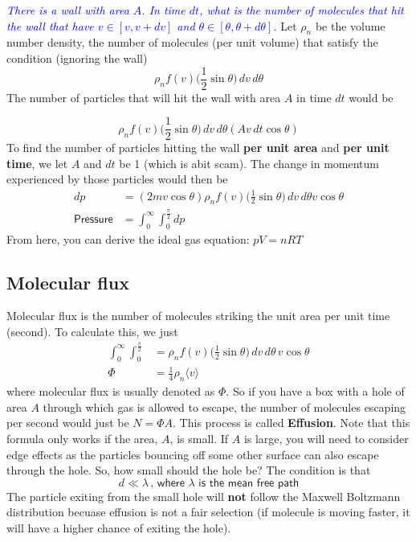 \textcolor{blue}{\textit{There is a wall with area $A$. In time $dt$, what is the number of molecules that hit the wall that have $v \in [v,v+dv]$ and $\theta \in [\theta,\theta+d\theta]$.}}
Let $\rho_n$ be the volume number density, the number of molecules (per unit volume) that satisfy the condition (ignoring the wall)
\begin{equation}
    \rho_n f(v)\bigg(\frac{1}{2}\sin\theta\bigg)\,dv\,d\theta
\end{equation}
The number of particles that will hit the wall with area $A$ in time $dt$ would be 

\begin{equation}
    \rho_n f(v)\bigg(\frac{1}{2}\sin\theta\bigg)\,dv\,d\theta (A v \,dt \cos \theta )
\end{equation}
To find the number of particles hitting the wall \textbf{per unit area} and \textbf{per unit time}, we let $A$ and $dt$ be 1 (which is abit scam). The change in momentum experienced by those particles would then be 
\begin{align}
    dp &= (2mv \cos \theta)  \rho_n f(v)\bigg(\frac{1}{2}\sin\theta\bigg)\,dv\,d\theta v \cos \theta \\
    \textsf{Pressure} &= \int_{0}^{\infty}\int_0^{\frac{\pi}{2}}dp 
\end{align}
From here, you can derive the ideal gas equation: $pV=nRT$

\subsection{Molecular flux}
Molecular flux is the number of molecules striking the unit area per unit time (second). To calculate this, we just
\begin{align}
    \int_{0}^{\infty}\int_0^{\frac{\pi}{2}} &=\rho_n f(v)\bigg(\frac{1}{2}\sin\theta\bigg)\,dv\,d\theta \,v \cos \theta\\
    \Phi &= \frac{1}{4}\rho_n \langle v \rangle
\end{align}
where molecular flux is usually denoted as $\Phi$. So if you have a box with a hole of area $A$ through which gas is allowed to escape, the number of molecules escaping per second would just be $N=\Phi A$. This process is called \textbf{Effusion}. Note that this formula only works if the area, $A$, is small. If $A$ is large, you will need to consider edge effects as the particles bouncing off some other surface can also escape through the hole. So, how small should the hole be? The condition is that 
\begin{equation}
    d \ll \lambda \, \textsf{, where $\lambda$ is the mean free path}
\end{equation}
The particle exiting from the small hole will \textbf{not} follow the Maxwell Boltzmann distribution becuase effusion is not a fair selection (if molecule is moving faster, it will have a higher chance of exiting the hole). 
